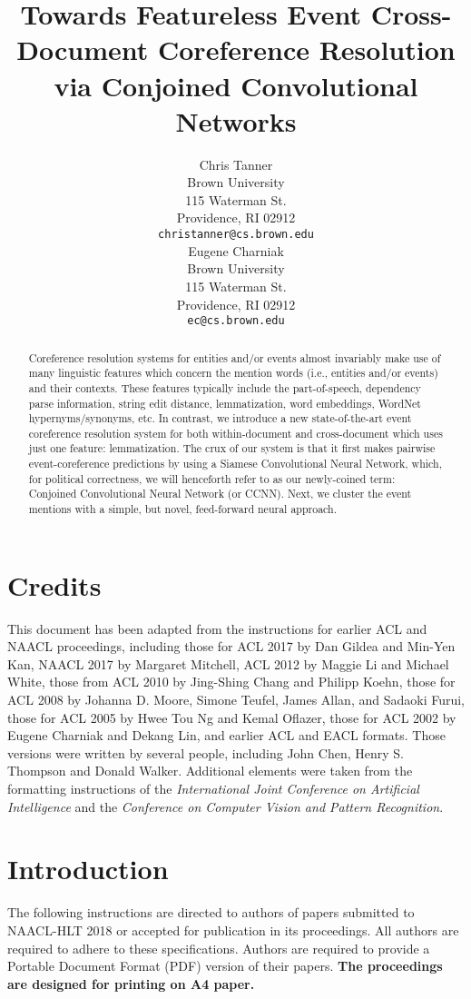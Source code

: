 \documentclass[11pt,a4paper]{article}
\title{Towards Featureless Event Cross-Document Coreference Resolution via Conjoined Convolutional Networks}
\author{Chris Tanner \\
  Brown University \\
  115 Waterman St. \\
  Providence, RI  02912 \\
  {\tt christanner@cs.brown.edu} \\\And
  Eugene Charniak \\
  Brown University \\
  115 Waterman St. \\
  Providence, RI  02912 \\
  {\tt ec@cs.brown.edu} \\}
\date{}
\begin{document}
\maketitle
\begin{abstract}
Coreference resolution systems for entities and/or events almost invariably make use of many linguistic features which concern the mention words (i.e., entities and/or events) and their contexts.  These features typically include the part-of-speech, dependency parse information, string edit distance, lemmatization, word embeddings, WordNet hypernyms/synonyms, etc.  In contrast, we introduce a new state-of-the-art event coreference resolution system for both within-document and cross-document which uses just one feature: lemmatization.  The crux of our system is that it first makes pairwise event-coreference predictions by using a Siamese Convolutional Neural Network, which, for political correctness, we will henceforth refer to as our newly-coined term: Conjoined Convolutional Neural Network (or CCNN).  Next, we cluster the event mentions with a simple, but novel, feed-forward neural approach.
\end{abstract}

\section{Credits}

This document has been adapted from the instructions
for earlier ACL and NAACL proceedings,
including those for ACL 2017 by Dan Gildea
and Min-Yen Kan, NAACL 2017 by Margaret
Mitchell, ACL 2012 by Maggie Li and Michael
White, those from ACL 2010 by Jing-Shing Chang
and Philipp Koehn, those for ACL 2008 by Johanna
D. Moore, Simone Teufel, James Allan, and
Sadaoki Furui, those for ACL 2005 by Hwee Tou
Ng and Kemal Oflazer, those for ACL 2002 by Eugene
Charniak and Dekang Lin, and earlier ACL
and EACL formats.
Those versions were written by several
people, including John Chen, Henry S. Thompson and Donald
Walker. Additional elements were taken from the formatting
instructions of the {\em International Joint Conference on Artificial
  Intelligence} and the \emph{Conference on Computer Vision and
  Pattern Recognition}.

\section{Introduction}

The following instructions are directed to authors of papers submitted
to NAACL-HLT 2018 or accepted for publication in its proceedings. All
authors are required to adhere to these specifications. Authors are
required to provide a Portable Document Format (PDF) version of their
papers. \textbf{The proceedings are designed for printing on A4
paper.}
\end{document}
